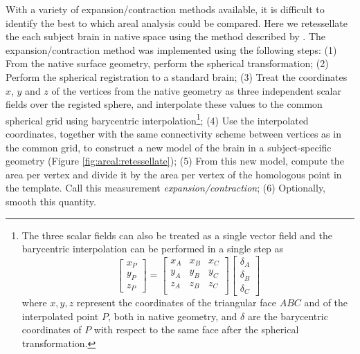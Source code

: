 With a variety of expansion/contraction methods available, it is difficult to identify the best to which areal analysis could be compared. Here we retessellate the each subject brain in native space using the method described by \citet{Saad2004}. The expansion/contraction method was implemented using the following steps: (1) From the native surface geometry, perform the spherical transformation; (2) Perform the spherical registration to a standard brain; (3) Treat the coordinates $x$, $y$ and $z$ of the vertices from the native geometry as three independent scalar fields over the registed sphere, and interpolate these values to the common spherical grid using barycentric interpolation\footnote{The three scalar fields can also be treated as a single vector field and the barycentric interpolation can be performed in a single step as
\begin{displaymath}
\left[
\begin{array}{c}
x_{P} \\
y_{P} \\
z_{P}
\end{array} \right] = \left[
\begin{array}{ccc}
x_{A} & x_{B} & x_{C} \\
y_{A} & y_{B} & y_{C} \\
z_{A} & z_{B} & z_{C} \\
\end{array}
\right] \left[
\begin{array}{c}
\delta_{A} \\
\delta_{B} \\
\delta_{C}
\end{array} \right]
\end{displaymath} where $x,y,z$ represent the coordinates of the triangular face $ABC$ and of the interpolated point $P$, both in native geometry, and $\delta$ are the barycentric coordinates of $P$ with respect to the same face after the spherical transformation.}; (4) Use the interpolated coordinates, together with the same connectivity scheme between vertices as in the common grid, to construct a new model of the brain in a subject-specific geometry (Figure \ref{fig:areal:retessellate}); (5) From this new model, compute the area per vertex and divide it by the area per vertex of the homologous point in the template. Call this measurement \emph{expansion/contraction}; (6) Optionally, smooth this quantity.


